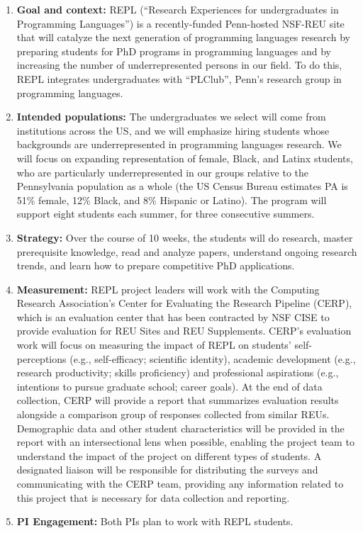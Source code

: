 \begin{enumerate}
\item {\bf Goal and context:} REPL (``Research Experiences for
undergraduates in Programming Languages'') is a recently-funded
Penn-hosted NSF-REU site that will catalyze the next generation of
programming languages research by preparing students for PhD programs
in programming languages and by increasing the number of
underrepresented persons in our field. To do this, REPL integrates
undergraduates with ``PLClub'', Penn’s research group in programming
languages.

\item {\bf Intended populations:} The undergraduates we select will
come from institutions across the US, and we will emphasize hiring
students whose backgrounds are underrepresented in programming
languages research. We will focus on expanding representation of
female, Black, and Latinx students, who are particularly
underrepresented in our
groups relative to the Pennsylvania population as a whole (the US Census Bureau
estimates PA is 51\% female, 12\% Black, and 8\% Hispanic or Latino).  The
program will support eight students  each
summer, for three consecutive summers.

\item {\bf Strategy:} Over the course of 10 weeks, the students will do
research, master prerequisite knowledge, read and analyze papers, understand
ongoing research trends, and learn how to prepare competitive PhD applications.
\item {\bf Measurement:}
REPL project leaders will work with the Computing Research Association’s Center for Evaluating the Research Pipeline (CERP), which is an evaluation center that has been contracted by NSF CISE to provide evaluation for REU Sites and REU Supplements. CERP’s evaluation work will focus on measuring the impact of REPL on students’ self-perceptions (e.g., self-efficacy; scientific identity), academic development (e.g., research productivity; skills proficiency) and professional aspirations (e.g., intentions to pursue graduate school; career goals). At the end of data collection, CERP will provide a report that summarizes evaluation results alongside a comparison group of responses collected from similar REUs. Demographic data and other student characteristics will be provided in the report with an intersectional lens when possible, enabling the project team to understand the impact of the project on different types of students. A designated liaison will be responsible for distributing the surveys and communicating with the CERP team, providing any information related to this project that is necessary for data collection and reporting.
\item {\bf PI Engagement:} Both PIs plan to work with REPL students.
%
\iflater{}\fi


\end{enumerate}
